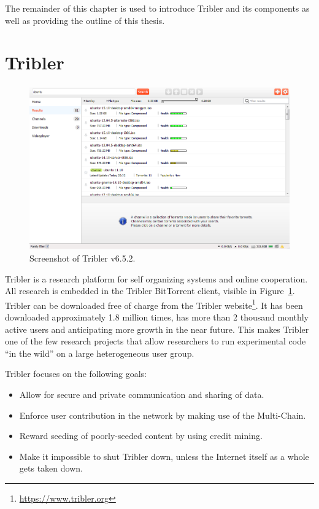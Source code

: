 The remainder of this chapter is used to introduce Tribler and its components as well as providing the outline of this thesis.

\section{Tribler}

\begin{figure}
	\includegraphics[width=\linewidth]{introduction/images/tribler_screenshot.png}
	\caption{Screenshot of Tribler v6.5.2.}
	\label{fig:tribler_screenshot}
\end{figure}


Tribler is a research platform for self organizing systems and online cooperation.
All research is embedded in the Tribler BitTorrent client, visible in Figure~\ref{fig:tribler_screenshot}.
Tribler can be downloaded free of charge from the Tribler website\footnote{\url{https://www.tribler.org}}.
It has been downloaded approximately 1.8 million times, has more than 2 thousand monthly active users and anticipating more growth in the near future.
This makes Tribler one of the few research projects that allow researchers to run experimental code \enquote{in the wild} on a large heterogeneous user group.

Tribler focuses on the following goals:
\begin{itemize}
    \item Allow for secure and private communication and sharing of data.
    \item Enforce user contribution in the network by making use of the Multi-Chain.
    \item Reward seeding of poorly-seeded content by using credit mining.
    \item Make it impossible to shut Tribler down, unless the Internet itself as a whole gets taken down.
\end{itemize}

